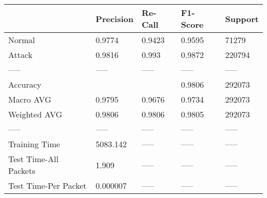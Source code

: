 \begin{tabular}{lllll}
\toprule
{} & Precision & Re-Call & F1-Score & Support \\
\midrule
Normal                &    0.9774 &  0.9423 &   0.9595 &   71279 \\
Attack                &    0.9816 &   0.993 &   0.9872 &  220794 \\
-----                 &     ----- &   ----- &    ----- &   ----- \\
Accuracy              &           &         &   0.9806 &  292073 \\
Macro AVG             &    0.9795 &  0.9676 &   0.9734 &  292073 \\
Weighted AVG          &    0.9806 &  0.9806 &   0.9805 &  292073 \\
-----                 &     ----- &   ----- &    ----- &   ----- \\
Training Time         &  5083.142 &   ----- &    ----- &   ----- \\
Test Time-All Packets &     1.909 &   ----- &    ----- &   ----- \\
Test Time-Per Packet  &  0.000007 &   ----- &    ----- &   ----- \\
\bottomrule
\end{tabular}
